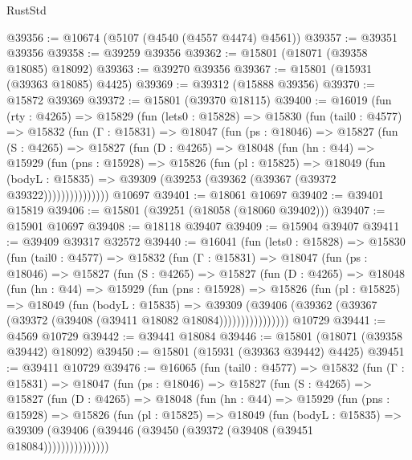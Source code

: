 \begin{lexlean}{RustStd}
\begin{coremodule}
@39356 := @10674 (@5107 (@4540 (@4557 @4474) @4561))
@39357 := @39351 @39356
@39358 := @39259 @39356
@39362 := @15801 (@18071 (@39358 @18085) @18092)
@39363 := @39270 @39356
@39367 := @15801 (@15931 (@39363 @18085) @4425)
@39369 := @39312 (@15888 @39356)
@39370 := @15872 @39369
@39372 := @15801 (@39370 @18115)
@39400 := @16019
    (fun (rty : @4265) =>
    @15829
      (fun (lets0 : @15828) =>
      @15830
        (fun (tail0 : @4577) =>
        @15832
          (fun (Γ : @15831) =>
          @18047
            (fun (ps : @18046) =>
            @15827
              (fun (S : @4265) =>
              @15827
                (fun (D : @4265) =>
                @18048
                  (fun (hn : @44) =>
                  @15929
                    (fun (pns : @15928) =>
                    @15826
                      (fun (pl : @15825) =>
                      @18049
                        (fun (bodyL : @15835) =>
                        @39309 (@39253 (@39362 (@39367 (@39372 @39322)))))))))))))))
    @10697
@39401 := @18061 @10697
@39402 := @39401 @15819
@39406 := @15801 (@39251 (@18058 (@18060 @39402)))
@39407 := @15901 @10697
@39408 := @18118 @39407
@39409 := @15904 @39407
@39411 := @39409 @39317 @32572
@39440 := @16041
    (fun (lets0 : @15828) =>
    @15830
      (fun (tail0 : @4577) =>
      @15832
        (fun (Γ : @15831) =>
        @18047
          (fun (ps : @18046) =>
          @15827
            (fun (S : @4265) =>
            @15827
              (fun (D : @4265) =>
              @18048
                (fun (hn : @44) =>
                @15929
                  (fun (pns : @15928) =>
                  @15826
                    (fun (pl : @15825) =>
                    @18049
                      (fun (bodyL : @15835) =>
                      @39309
                        (@39406
                          (@39362 (@39367 (@39372 (@39408 (@39411 @18082 @18084))))))))))))))))
    @10729
@39441 := @4569 @10729
@39442 := @39441 @18084
@39446 := @15801 (@18071 (@39358 @39442) @18092)
@39450 := @15801 (@15931 (@39363 @39442) @4425)
@39451 := @39411 @10729
@39476 := @16065
    (fun (tail0 : @4577) =>
    @15832
      (fun (Γ : @15831) =>
      @18047
        (fun (ps : @18046) =>
        @15827
          (fun (S : @4265) =>
          @15827
            (fun (D : @4265) =>
            @18048
              (fun (hn : @44) =>
              @15929
                (fun (pns : @15928) =>
                @15826
                  (fun (pl : @15825) =>
                  @18049
                    (fun (bodyL : @15835) =>
                    @39309 (@39406 (@39446 (@39450 (@39372 (@39408 (@39451 @18084)))))))))))))))

\end{coremodule}
\end{lexlean}
